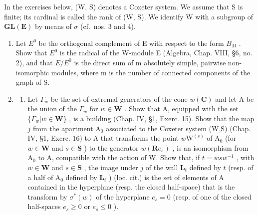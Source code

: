 
In the exercises below, (W, S) denotes a Coxeter system. We assume that S is finite; its cardinal is called the rank of (W, S). We identify W with a subgroup of \(\mathbf{GL}(\mathbf{E})\) by means of \(\sigma\) (cf.~nos. 3 and 4).

\begin{enumerate}
\def\labelenumi{\arabic{enumi})}
\item
  Let \(E^{0}\) be the orthogonal complement of E with respect to the form \(B_{M}\) . Show that \(E^{0}\) is the radical of the W-module E (Algebra, Chap. VIII, §6, no. 2), and that \(E/E^{0}\) is the direct sum of m absolutely simple, pairwise non-isomorphic modules, where m is the number of connected components of the graph of S.
\item
  \begin{enumerate}
  \def\labelenumii{\alph{enumii})}
  \tightlist
  \item
    Let \(\Gamma_w\) be the set of extremal generators of the cone \(w(\mathbf{C})\) and let A be the union of the \(\Gamma_w\) for \(w \in \mathbf{W}\) . Show that A, equipped with the set \(\{\Gamma_w | w \in \mathbf{W}\}\) , is a building (Chap. IV, §1, Exerc. 15). Show that the map \(j\) from the apartment \(\mathrm{A}_0\) associated to the Coxeter system (W,S) (Chap. IV, §1, Exerc. 16) to A that transforms the point \(w\mathrm{W}^{(s)}\) of \(\mathrm{A}_0\) (for \(w \in \mathbf{W}\) and \(s \in \mathbf{S}\) ) to the generator \(w(\mathbf{R}e_s)\) , is an isomorphism from \(\mathrm{A}_0\) to A, compatible with the action of W. Show that, if \(t = wsw^{-1}\) , with \(w \in \mathbf{W}\) and \(s \in \mathbf{S}\) , the image under \(j\) of the wall \(\mathbf{L}_t\) defined by \(t\) (resp. of a half of \(\mathrm{A}_0\) defined by \(\mathbf{L}_t\) ) (loc. cit.) is the set of elements of A contained in the hyperplane (resp. the closed half-space) that is the transform by \(\sigma^*(w)\) of the hyperplane \(e_s = 0\) (resp. of one of the closed half-spaces \(e_s \geqslant 0\) or \(e_s \leqslant 0\) ).
  \end{enumerate}
\end{enumerate}

